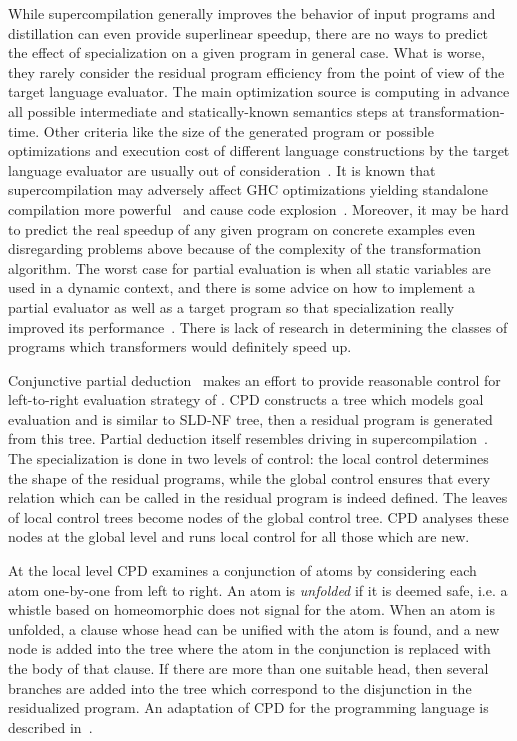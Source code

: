 While supercompilation generally improves the behavior of input programs and distillation can even provide superlinear speedup, there are no ways to predict the effect of specialization on a given program in general case.
What is worse, they rarely consider the residual program efficiency from the point of view of the target language evaluator.
The main optimization source is computing in advance all possible intermediate and statically-known semantics steps at transformation-time.
Other criteria like the size of the generated program or possible optimizations and execution cost of different language constructions by the target language evaluator are usually out of consideration~\cite{jonesbook}.
It is known that supercompilation may adversely affect GHC optimizations yielding standalone compilation more powerful~\cite{SCBE,TCES} and cause code explosion~\cite{SCHC}.
Moreover, it may be hard to predict the real speedup of any given program on concrete examples even disregarding problems above because of the complexity of the transformation algorithm.
The worst case for partial evaluation is when all static variables are used in a dynamic context, and there is some advice on how to implement a partial evaluator as well as a target program so that specialization really improved its performance~\cite{jonesbook,bulyonkov84}.
There is lack of research in determining the classes of programs which transformers would definitely speed up.

Conjunctive partial deduction~\cite{de1999conjunctive} makes an effort to provide reasonable control for left-to-right evaluation strategy of \pro{}.
CPD constructs a tree which models goal evaluation and is similar to SLD-NF tree, then a residual program is generated from this tree.
Partial deduction itself resembles driving in supercompilation~\cite{gluck1994partial}.
The specialization is done in two levels of control: the local control determines the shape of the residual programs, while the global control ensures that every relation which can be called in the residual program is indeed defined.
The leaves of local control trees become nodes of the global control tree.
CPD analyses these nodes at the global level and runs local control for all those which are new.

At the local level CPD examines a conjunction of atoms by considering each atom one-by-one from left to right.
An atom is \emph{unfolded} if it is deemed safe, i.e. a whistle based on homeomorphic does not signal for the atom.
When an atom is unfolded, a clause whose head can be unified with the atom is found, and a new node is added into the tree where the atom in the conjunction is replaced with the body of that clause.
If there are more than one suitable head, then several branches are added into the tree which correspond to the disjunction in the residualized program.
An adaptation of CPD for the \mk{} programming language is described in~\cite{lozov2019relational}.

